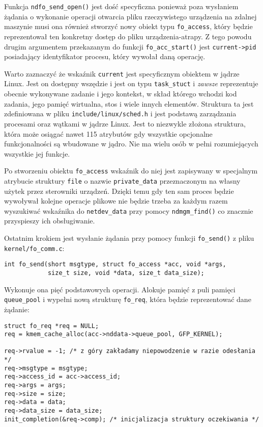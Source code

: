 \documentclass[10pt]{article}
\begin{document}
Funkcja \texttt{ndfo\_send\_open()} jest dość specyficzna ponieważ poza wysłaniem żądania o wykonanie operacji otwarcia pliku rzeczywistego urządzenia na zdalnej maszynie musi ona również stworzyć nowy obiekt typu \texttt{fo\_access}, który będzie reprezentował ten konkretny dostęp do pliku urządzenia-atrapy. Z tego powodu drugim argumentem przekazanym do funkcji \texttt{fo\_acc\_start()} jest \texttt{current-\textgreater{}pid} posiadający identyfikator procesu, który wywołał daną operację.

Warto zaznaczyć że wskaźnik \texttt{current} jest specyficznym obiektem w jądrze Linux. Jest on dostępny wszędzie i jest on typu \texttt{task\_stuct} i \emph{zawsze} reprezentuje obecnie wykonywane zadanie i jego kontekst, w skład którego wchodzi kod zadania, jego pamięć wirtualna, stos i wiele innych elementów. Struktura ta jest zdefiniowana w pliku \texttt{include/linux/sched.h} i jest podstawą zarządzania procesami oraz wątkami w jądrze Linux. Jest to niezwykle złożona struktura, która może osiągać nawet 115 atrybutów gdy wszystkie opcjonalne funkcjonalności są wbudowane w jądro. Nie ma wielu osób w pełni rozumiejących wszystkie jej funkcje.

Po stworzeniu obiektu \texttt{fo\_access} wskaźnik do niej jest zapisywany w specjalnym atrybucie struktury \texttt{file} o nazwie \texttt{private\_data} przeznaczonym na własny użytek przez sterowniki urządzeń. Dzięki temu gdy ten sam proces będzie wywoływał kolejne operacje plikowe nie będzie trzeba za każdym razem wyszukiwać wskaźnika do \texttt{netdev\_data} przy pomocy \texttt{ndmgm\_find()} co znacznie przyspieszy ich obsługiwanie.

Ostatnim krokiem jest wysłanie żądania przy pomocy funkcji \texttt{fo\_send()} z pliku \texttt{kernel/fo\_comm.c}:

\begin{verbatim}
int fo_send(short msgtype, struct fo_access *acc, void *args,
            size_t size, void *data, size_t data_size);
\end{verbatim}

Wykonuje ona pięć podstawowych operacji. Alokuje pamięć z puli pamięci \texttt{queue\_pool} i wypełni nową strukturę \texttt{fo\_req}, która będzie reprezentować dane żądanie:

\begin{verbatim}
struct fo_req *req = NULL;
req = kmem_cache_alloc(acc->nddata->queue_pool, GFP_KERNEL);

req->rvalue = -1; /* z góry zakładamy niepowodzenie w razie odesłania */
req->msgtype = msgtype;
req->access_id = acc->access_id;
req->args = args;
req->size = size;
req->data = data;
req->data_size = data_size;
init_completion(&req->comp); /* inicjalizacja struktury oczekiwania */
\end{verbatim}
\end{document}
